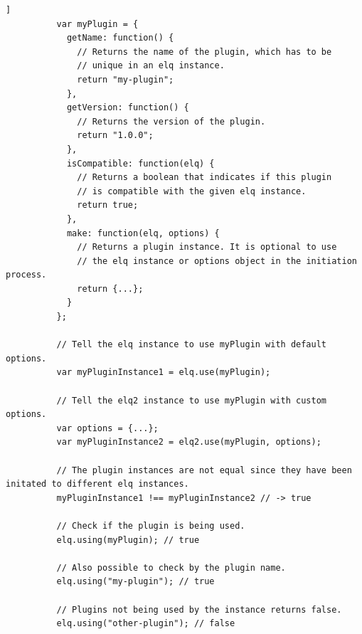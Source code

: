 \documentclass[a4paper,11pt]{kth-mag}
\begin{document}
        \begin{lstlisting}[gobble=10,caption={Plugin object definition and examples of handling plugins.},captionpos=b,label={code:plugin-object}]]
          var myPlugin = {
            getName: function() {
              // Returns the name of the plugin, which has to be 
              // unique in an elq instance.
              return "my-plugin";
            },
            getVersion: function() {
              // Returns the version of the plugin.
              return "1.0.0";
            },
            isCompatible: function(elq) {
              // Returns a boolean that indicates if this plugin
              // is compatible with the given elq instance.
              return true;
            },
            make: function(elq, options) {
              // Returns a plugin instance. It is optional to use
              // the elq instance or options object in the initiation process.
              return {...};
            }
          };

          // Tell the elq instance to use myPlugin with default options.
          var myPluginInstance1 = elq.use(myPlugin);

          // Tell the elq2 instance to use myPlugin with custom options.
          var options = {...};
          var myPluginInstance2 = elq2.use(myPlugin, options);

          // The plugin instances are not equal since they have been initated to different elq instances.
          myPluginInstance1 !== myPluginInstance2 // -> true

          // Check if the plugin is being used.
          elq.using(myPlugin); // true

          // Also possible to check by the plugin name.
          elq.using("my-plugin"); // true

          // Plugins not being used by the instance returns false.
          elq.using("other-plugin"); // false
        \end{lstlisting}
\end{document}
